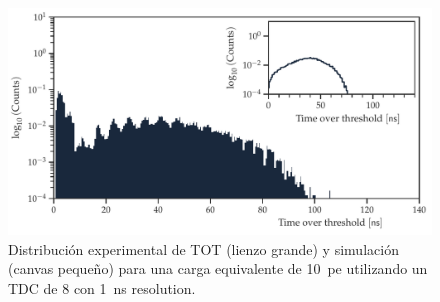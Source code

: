 \begin{figure}
        \centering
        \includegraphics[width=\textwidth]{tdc_sim-exp.pdf}
        \caption{Distribución experimental de TOT (lienzo grande) y simulación (canvas pequeño) para una carga equivalente de \SI{10}{pe} utilizando un TDC de \SI{8}{\bit} con \SI{1}{\ns} resolution.}
        \label{fig:tdc-simexp}
\end{figure}
